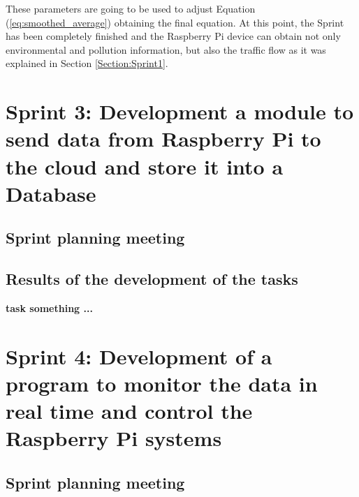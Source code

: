 These parameters are going to be used to adjust Equation (\ref{eq:smoothed_average}) obtaining the final equation. At this point, the Sprint has been completely finished and the Raspberry Pi device can obtain not only environmental and pollution information, but also the traffic flow as it was explained in Section \ref{Section:Sprint1}.


\section{Sprint 3: Development a module to send data from Raspberry Pi to the cloud and store it into a Database}

\subsection{Sprint planning meeting}



\subsection{Results of the development of the tasks}
\textbf{task something ...}



\section{Sprint 4: Development of a program to monitor the data in real time and control the Raspberry Pi systems}

\subsection{Sprint planning meeting}


